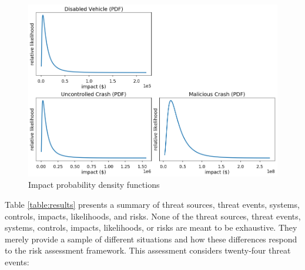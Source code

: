 \documentclass{article}
\begin{document}
\begin{figure}[h] \centering
    \includegraphics[width=\textwidth]{images/impacts.png}
    \caption{Impact probability density functions}
    \label{figure:impacts}
\end{figure}

Table \ref{table:results} presents a summary of threat sources, threat events, systems, controls, impacts, likelihoods, and risks. None of the threat sources, threat events, systems, controls, impacts, likelihoods, or risks are meant to be exhaustive. They merely provide a sample of different situations and how these differences respond to the risk assessment framework. This assessment considers twenty-four threat events:
\end{document}
